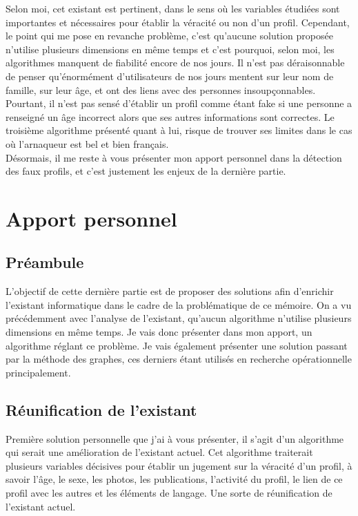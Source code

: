 \documentclass[12pt]{report}
\begin{document}
Selon moi, cet existant est pertinent, dans le sens où les variables étudiées sont importantes et nécessaires pour établir la véracité ou non d'un profil. Cependant, le point qui me pose en revanche problème, c'est qu'aucune solution proposée n'utilise plusieurs dimensions en même temps et c'est pourquoi, selon moi, les algorithmes manquent de fiabilité encore de nos jours. Il n'est pas déraisonnable de penser qu'énormément d'utilisateurs de nos jours mentent sur leur nom de famille, sur leur âge, et ont des liens avec des personnes insoupçonnables. Pourtant, il n'est pas sensé d'établir un profil comme étant fake si une personne a renseigné un âge incorrect alors que ses autres informations sont correctes. Le troisième algorithme présenté quant à lui, risque de trouver ses limites dans le cas où l'arnaqueur est bel et bien français. \\

Désormais, il me reste à vous présenter mon apport personnel dans la détection des faux profils, et c'est justement les enjeux de la dernière partie.

\chapter{Apport personnel}
\section{Préambule}
L'objectif de cette dernière partie est de proposer des solutions afin d'enrichir l'existant informatique dans le cadre de la problématique de ce mémoire. On a vu précédemment avec l'analyse de l'existant, qu'aucun algorithme n'utilise plusieurs dimensions en même temps. Je vais donc présenter dans mon apport, un algorithme réglant ce problème. Je vais également présenter une solution passant par la méthode des graphes, ces derniers étant utilisés en recherche opérationnelle principalement. 

\section{Réunification de l'existant}

Première solution personnelle que j'ai à vous présenter, il s'agit d'un algorithme qui serait une amélioration de l'existant actuel. Cet algorithme traiterait plusieurs variables décisives pour établir un jugement sur la véracité d'un profil, à savoir l'âge, le sexe, les photos, les publications, l'activité du profil, le lien de ce profil avec les autres et les éléments de langage. Une sorte de réunification de l'existant actuel. \\
\end{document}
